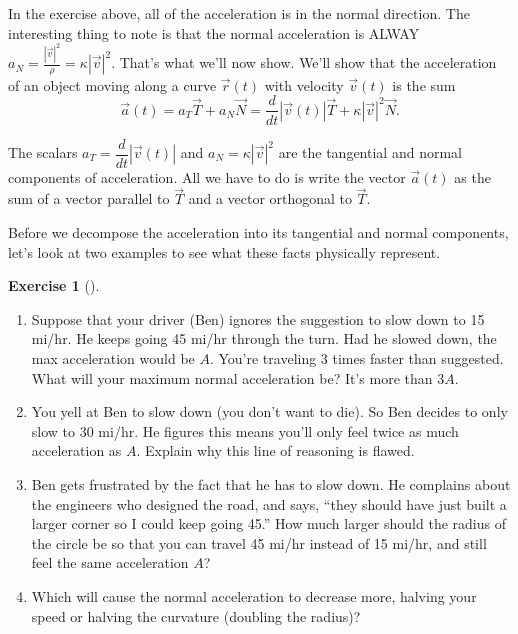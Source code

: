 \documentclass[10pt,]{book}
\theoremstyle{plain}
\theoremstyle{definition}
\theoremstyle{definition}
\theoremstyle{definition}
\theoremstyle{definition}
\newtheorem{exploration}[project]{Exercise}
\theoremstyle{definition}
\numberwithin{equation}{section}
\begin{document}
In the exercise above, all of the acceleration is in the normal direction. The interesting thing to note is that the normal acceleration is ALWAY \(a_N =  \frac{|\vec v|^2}{\rho}=\kappa |\vec v|^2\). That's what we'll now show. We'll show that the acceleration of an object moving along a curve \(\vec r(t)\) with velocity \(\vec v(t)\) is the sum%
\begin{equation*}
\vec a(t) = a_T\vec T+a_N\vec N=\frac{d}{dt}|\vec v(t)| \vec T + \kappa |\vec v|^2 \vec N.
\end{equation*}
%
\par
The scalars \(a_T=\dfrac{d}{dt}|\vec v(t)|\) and \(a_N=\kappa |\vec v|^2\) are the tangential and normal components of acceleration. All we have to do is write the vector \(\vec a(t)\) as the sum of a vector parallel to \(\vec T\) and a vector orthogonal to \(\vec T\).%
\par
Before we decompose the acceleration into its tangential and normal components, let's look at two examples to see what these facts physically represent.%
\begin{exploration}[]\label{exploration-182}
\leavevmode%
\begin{enumerate}[font=\bfseries,label=(\alph*),ref=\alph*]
\item\label{task-453} Suppose that your driver (Ben) ignores the suggestion to slow down to 15 mi/hr.  He keeps going 45 mi/hr through the turn. Had he slowed down, the max acceleration would be \(A\).  You're traveling 3 times faster than suggested.  What will your maximum normal acceleration be? It's more than \(3A\).%
%
\item\label{task-454} You yell at Ben to slow down (you don't want to die). So Ben decides to only slow to 30 mi/hr. He figures this means you'll only feel twice as much acceleration as \(A\).  Explain why this line of reasoning is flawed.%
\item\label{task-455} Ben gets frustrated by the fact that he has to slow down. He complains about the engineers who designed the road, and says, ``they should have just built a larger corner so I could keep going 45.''  How much larger should the radius of the circle be so that you can travel 45 mi/hr instead of 15 mi/hr, and still feel the same acceleration \(A\)?%
\item\label{task-456} Which will cause the normal acceleration to decrease more, halving your speed or halving the curvature (doubling the radius)?%
\end{enumerate}
\end{exploration}
\end{document}
